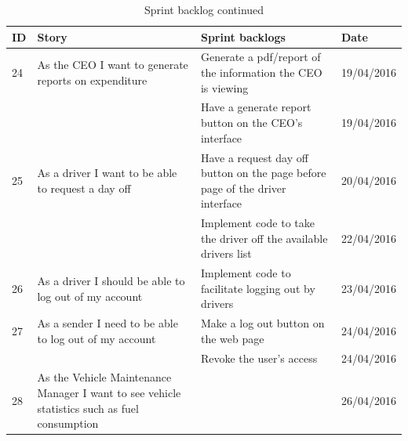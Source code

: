 \documentclass[paper=a4, fontsize=11pt]{scrartcl} %
\numberwithin{equation}{section} %
\numberwithin{figure}{section} %
\numberwithin{table}{section} %
\begin{document}
\begin{table}[!hbt]
\centering
\caption{Sprint backlog continued}

\begin{tabular}{|p{1cm}|p{5cm}|p{5cm}|p{2cm}|}
\hline
\textbf{ID} & \textbf{Story}                                                                               & \textbf{Sprint backlogs}                                                      & \textbf{Date} \\ \hline
24          & As the CEO I want to generate reports on expenditure                                         & Generate a pdf/report of the information the CEO is viewing                   & 19/04/2016    \\ \hline
            &                                                                                              & Have a generate report button on the CEO's interface                          & 19/04/2016    \\ \hline
25          & As a driver I want to be able to request a day off                                           & Have a request day off button on the page before page of the driver interface & 20/04/2016    \\ \hline
            &                                                                                              & Implement code to take the driver off the available drivers list              & 22/04/2016    \\ \hline
26          & As a driver I should be able to log out of my account                                        & Implement code to facilitate logging out by drivers                           & 23/04/2016    \\ \hline
27          & As a sender I need to be able to log out of my account                                       & Make a log out button on the web page                                         & 24/04/2016    \\ \hline
            &                                                                                              & Revoke the user's access                                                      & 24/04/2016    \\ \hline
28          & As the Vehicle Maintenance Manager I want to see vehicle statistics such as fuel consumption &                                                                               & 26/04/2016    \\ \hline
\end{tabular}
\end{table}
\end{document}
